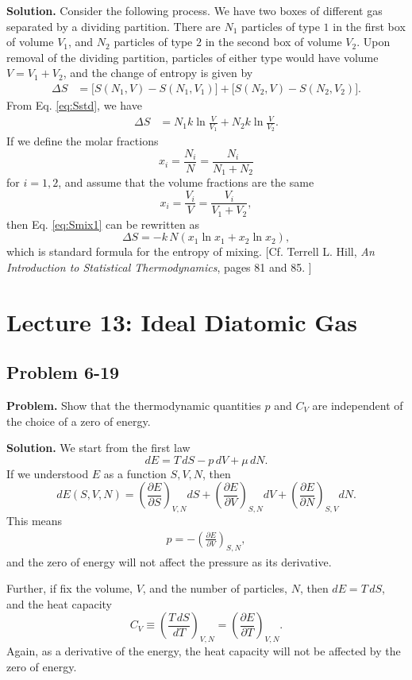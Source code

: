 \documentclass[twocolumn, 10pt]{article}
\numberwithin{equation}{section}
\newenvironment{problem}
{\par\medskip\sffamily \color{problue}
  \textbf{Problem. }\ignorespaces}
{\medskip}
\newenvironment{solution}
{\par\medskip
  \textbf{Solution. }\ignorespaces}
{\medskip}
\begin{document}
\begin{solution}
Consider the following process.
We have two boxes of different gas
separated by a dividing partition.
%
There are $N_1$ particles of type $1$ in the first box of volume $V_1$,
and $N_2$ particles of type $2$ in the second box of volume $V_2$.
%
Upon removal of the dividing partition,
particles of either type would have volume $V = V_1 + V_2$,
and the change of entropy is given by
%
\begin{align*}
  \Delta S
  &=
    \bigl[ S(N_1, V) - S(N_1, V_1) \bigr]
  + \bigl[ S(N_2, V) - S(N_2, V_2) \bigr]
  .
\end{align*}
%
From Eq. \eqref{eq:Sstd}, we have
\begin{align}
  \Delta S
  &=
  N_1 k \ln \frac{V}{V_1}
  +
  N_2 k \ln \frac{V}{V_2}.
  \label{eq:Smix1}
\end{align}
%
If we define the molar fractions
$$x_i = \frac{ N_i } { N } = \frac{ N_i } { N_1 + N_2 }$$
for $i = 1, 2$,
and assume that the volume fractions are the same
$$x_i = \frac{ V_i } { V } = \frac{ V_i } { V_1 + V_2 },$$
then Eq. \eqref{eq:Smix1} can be rewritten as
$$
\Delta S = -k \, N (x_1 \ln x_1 + x_2 \ln x_2),
$$
which is standard formula for the entropy of mixing.
[Cf. Terrell L. Hill,
  \emph{An Introduction to Statistical Thermodynamics},
  pages 81 and 85. ]
\end{solution}


\section{Lecture 13: Ideal Diatomic Gas}

\subsection{Problem 6-19}

\begin{problem}
Show that the thermodynamic quantities $p$ and $C_V$
are independent of the choice of a zero of energy.
\end{problem}

\begin{solution}
We start from the first law
$$dE = T \, dS - p \, dV + \mu \, dN.$$
If we understood $E$ as a function $S, V, N$,
then
$$
  dE(S, V, N)
  =
   \left( \frac{\partial E}{\partial S} \right)_{V, N} dS
  +\left( \frac{\partial E}{\partial V} \right)_{S, N} dV
  +\left( \frac{\partial E}{\partial N} \right)_{S, V} dN
  .
$$
This means
\begin{align*}
  p = -\left( \frac{\partial E}{\partial V} \right)_{S, N},
\end{align*}
and the zero of energy will not affect the pressure as its derivative.

Further, if fix the volume, $V$, and the number of particles, $N$,
then $dE = T \, dS$,
and the heat capacity
$$
  C_V \equiv \left( \frac{ T \, dS } { dT } \right)_{V, N}
  = \left( \frac{ \partial E } { \partial T } \right)_{V, N}.
$$
Again, as a derivative of the energy,
the heat capacity will not be affected by the zero of energy.
\end{solution}
\end{document}
